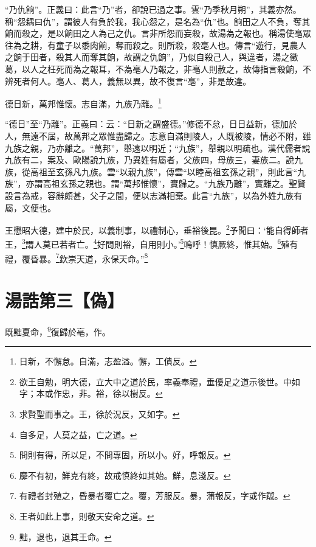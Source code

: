 {\noindent\shu{}\fzkt “乃仇餉”。正義曰：此言“乃”者，卻說已過之事。雲“乃季秋月朔”，其義亦然。稱“怨耦曰仇”，謂彼人有負於我，我心怨之，是名為“仇”也。餉田之人不負，奪其餉而殺之，是以餉田之人為己之仇。言非所怨而妄殺，故湯為之報也。稱湯使亳眾往為之耕，有童子以黍肉餉，奪而殺之。則所殺，殺亳人也。傳言“遊行，見農人之餉于田者，殺其人而奪其餉，故謂之仇餉”，乃似自殺己人，與違者，湯之徵葛，以人之枉死而為之報耳，不為亳人乃報之，非亳人則赦之，故傳指言殺餉，不辨死者何人。亳人、葛人，義無以異，故不復言“亳”，非是故違。 \par}

德日新，萬邦惟懷。志自滿，九族乃離。\footnote{日新，不懈怠。自滿，志盈溢。懈，工債反。}

{\noindent\shu{}\fzkt “德日”至“乃離”。正義曰：云：“日新之謂盛德。”修德不怠，日日益新，德加於人，無遠不屆，故萬邦之眾惟盡歸之。志意自滿則陵人，人既被陵，情必不附，雖九族之親，乃亦離之。“萬邦”，舉遠以明近；“九族”，舉親以明疏也。漢代儒者說九族有二，案及、歐陽說九族，乃異姓有屬者，父族四，母族三，妻族二。說九族，從高祖至玄孫凡九族。雲“以親九族”，傳雲“以睦高祖玄孫之親”，則此言“九族”，亦謂高祖玄孫之親也。謂“萬邦惟懷”，實歸之。“九族乃離”，實離之。聖賢設言為戒，容辭頗甚，父子之間，便以志滿相棄。此言“九族”，以為外姓九族有屬，文便也。 \par}

王懋昭大德，建中於民，以義制事，以禮制心，垂裕後昆。\footnote{欲王自勉，明大德，立大中之道於民，率義奉禮，垂優足之道示後世。中如字；本或作忠，非。裕，徐以樹反。}予聞曰：‘能自得師者王，\footnote{求賢聖而事之。王，徐於況反，又如字。}謂人莫已若者亡。\footnote{自多足，人莫之益，亡之道。}好問則裕，自用則小。’\footnote{問則有得，所以足，不問專固，所以小。好，呼報反。}嗚呼！慎厥終，惟其始。\footnote{靡不有初，鮮克有終，故戒慎終如其始。鮮，息淺反。}殖有禮，覆昏暴。\footnote{有禮者封殖之，昏暴者覆亡之。覆，芳服反。暴，蒲報反，字或作虣。}欽崇天道，永保天命。”\footnote{王者如此上事，則敬天安命之道。}

\section{湯誥第三【偽】}

既黜夏命，\footnote{黜，退也，退其王命。}復歸於亳，作。

